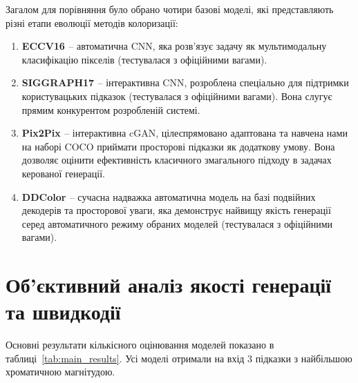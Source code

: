         Загалом для порівняння було обрано чотири базові моделі, які представляють різні етапи еволюції методів колоризації:
        \begin{enumerate}
            \item \textbf{ECCV16 \cite{2016-colorful-image-colorization}} -- автоматична CNN, яка розв'язує задачу як мультимодальну класифікацію пікселів (тестувалася з офіційними вагами).
            \item \textbf{SIGGRAPH17 \cite{2017-real-time-user-guided-image-colorization}} -- інтерактивна CNN, розроблена спеціально для підтримки користувацьких підказок (тестувалася з офіційними вагами).
                Вона слугує прямим конкурентом розробленій системі.
            \item \textbf{Pix2Pix \cite{2017-image-to-image-translation}} -- інтерактивна cGAN, цілеспрямовано адаптована та навчена нами на наборі COCO приймати просторові підказки як додаткову умову.
                Вона дозволяє оцінити ефективність класичного змагального підходу в задачах керованої генерації.
            \item \textbf{DDColor \cite{2023-ddcolor}} -- сучасна надважка автоматична модель на базі подвійних декодерів та просторової уваги,
                яка демонструє найвищу якість генерації серед автоматичного режиму обраних моделей (тестувалася з офіційними вагами).
        \end{enumerate}

    \section{Об'єктивний аналіз якості генерації та швидкодії}

        Основні результати кількісного оцінювання моделей показано в таблиці~\ref{tab:main_results}.
        Усі моделі отримали на вхід 3 підказки з найбільшою хроматичною магнітудою.

